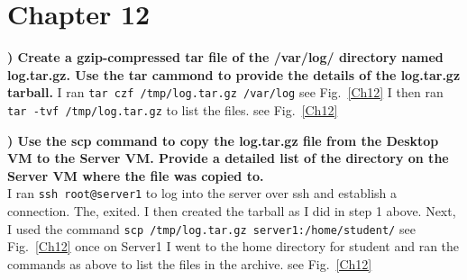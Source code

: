 \documentclass{report}
\newcommand{\mysection}[1]{\section*{#1}}
\newcommand{\mysubsection}[2]{\textbf{\romannumeral #1) #2}}
\begin{document}
\clearpage


\mysection{\textbf{Chapter 12}}

\mysubsection{1}{Create a gzip-compressed tar file of the /var/log/ directory named 
log.tar.gz. Use the tar cammond to provide the details of the log.tar.gz tarball.}
I ran {\scriptsize{\verb$tar czf /tmp/log.tar.gz /var/log$}\normalsize} 
see Fig.~\ref{Ch12}
I then ran {\scriptsize{\verb$tar -tvf /tmp/log.tar.gz$}\normalsize} to list
the files. 
see Fig.~\ref{Ch12}
\hfill\break

\noindent\mysubsection{2}{Use the scp command to copy the log.tar.gz file from the
Desktop VM to the Server VM. Provide a detailed
list of the directory on the Server VM where the file was copied to.}
\\I ran {\scriptsize{\verb$ssh root@server1$}\normalsize} to log into the
server over ssh and establish a connection. The, exited. I then created the tarball as I did in step 1 above. Next,
I used the command 
{\scriptsize{\verb$scp /tmp/log.tar.gz server1:/home/student/$}\normalsize} 
see Fig.~\ref{Ch12}
once on Server1 I went to the home directory for student and ran the commands
as above to list the files in the archive.
see Fig.~\ref{Ch12}
\end{document}
